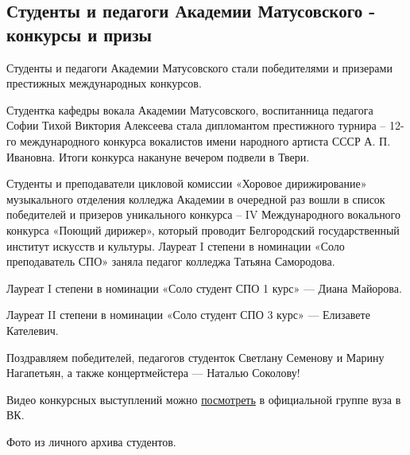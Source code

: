  
 
 
 
 
\subsection{Студенты и педагоги Академии Матусовского - конкурсы и призы}
\label{sec:07_12_2021.stz.edu.lnr.lgaki.1.konkursy_prizy}


Студенты и педагоги Академии Матусовского стали победителями и призерами
престижных международных конкурсов.


Студентка кафедры вокала Академии Матусовского, воспитанница педагога Софии
Тихой Виктория Алексеева стала дипломантом престижного турнира – 12-го
международного конкурса вокалистов имени народного артиста СССР А. П. Ивановна.
Итоги конкурса накануне вечером подвели в Твери.

Студенты и преподаватели цикловой комиссии «Хоровое дирижирование» музыкального
отделения колледжа Академии в очередной раз вошли в список победителей и
призеров уникального конкурса – IV Международного вокального конкурса «Поющий
дирижер», который проводит Белгородский государственный институт искусств и
культуры.  Лауреат I степени в номинации «Соло преподаватель СПО» заняла
педагог колледжа Татьяна Самородова.


Лауреат I степени в номинации «Соло студент СПО 1 курс» — Диана Майорова.

Лауреат II степени в номинации «Соло студент СПО 3 курс» — Елизавете Кателевич.

Поздравляем победителей, педагогов студенток Светлану Семенову и Марину
Нагапетьян, а также концертмейстера — Наталью Соколову!

Видео конкурсных выступлений можно
\href{https://vk.com/wall-972076_33328}{посмотреть} в официальной группе вуза в
ВК.

Фото из личного архива студентов.


